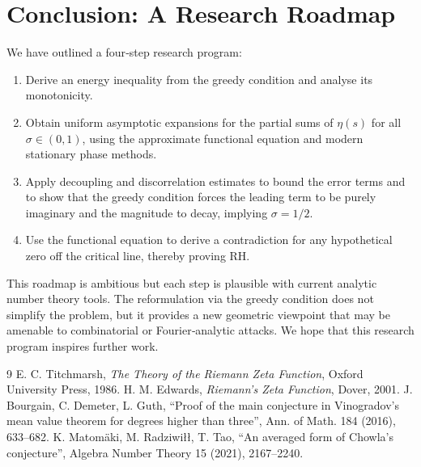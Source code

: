 \documentclass[12pt,a4paper]{article}
\begin{document}
\section{Conclusion: A Research Roadmap}

We have outlined a four‑step research program:

\begin{enumerate}
    \item Derive an energy inequality from the greedy condition and analyse its monotonicity.
    \item Obtain uniform asymptotic expansions for the partial sums of $\eta(s)$ for all $\sigma\in(0,1)$, using the approximate functional equation and modern stationary phase methods.
    \item Apply decoupling and discorrelation estimates to bound the error terms and to show that the greedy condition forces the leading term to be purely imaginary and the magnitude to decay, implying $\sigma=1/2$.
    \item Use the functional equation to derive a contradiction for any hypothetical zero off the critical line, thereby proving RH.
\end{enumerate}

This roadmap is ambitious but each step is plausible with current analytic number theory tools. The reformulation via the greedy condition does not simplify the problem, but it provides a new geometric viewpoint that may be amenable to combinatorial or Fourier‑analytic attacks. We hope that this research program inspires further work.

\begin{thebibliography}{9}
 E. C. Titchmarsh, \textit{The Theory of the Riemann Zeta Function}, Oxford University Press, 1986.
 H. M. Edwards, \textit{Riemann's Zeta Function}, Dover, 2001.
 J. Bourgain, C. Demeter, L. Guth, ``Proof of the main conjecture in Vinogradov's mean value theorem for degrees higher than three'', Ann. of Math. 184 (2016), 633–682.
 K. Matomäki, M. Radziwiłł, T. Tao, ``An averaged form of Chowla's conjecture'', Algebra Number Theory 15 (2021), 2167–2240.
\end{thebibliography}
\end{document}
